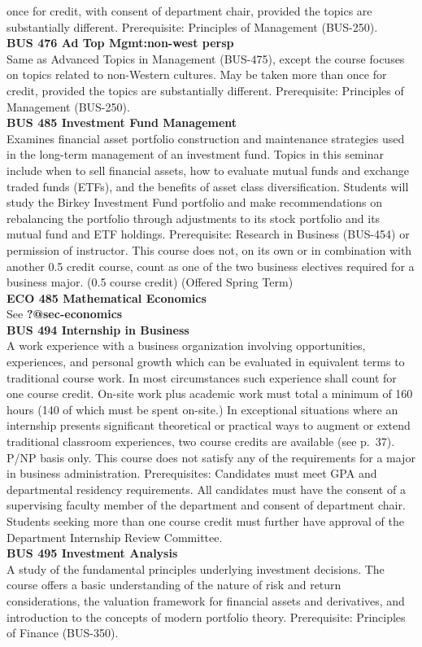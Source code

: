 \documentclass[
  letterpaper,
]{scrbook}
\begin{document}
once for credit, with consent of department chair, provided the topics
are substantially different. Prerequisite: Principles of Management
(BUS-250).\\
\textbf{BUS 476 Ad Top Mgmt:non-west persp}\\
Same as Advanced Topics in Management (BUS-475), except the course
focuses on topics related to non-Western cultures. May be taken more
than once for credit, provided the topics are substantially different.
Prerequisite: Principles of Management (BUS-250).\\
\textbf{BUS 485 Investment Fund Management}\\
Examines financial asset portfolio construction and maintenance
strategies used in the long-term management of an investment fund.
Topics in this seminar include when to sell financial assets, how to
evaluate mutual funds and exchange traded funds (ETFs), and the benefits
of asset class diversification. Students will study the Birkey
Investment Fund portfolio and make recommendations on rebalancing the
portfolio through adjustments to its stock portfolio and its mutual fund
and ETF holdings. Prerequisite: Research in Business (BUS-454) or
permission of instructor. This course does not, on its own or in
combination with another 0.5 credit course, count as one of the two
business electives required for a business major. (0.5 course credit)
(Offered Spring Term)\\
\textbf{ECO 485 Mathematical Economics}\\
See \textbf{?@sec-economics}\\
\textbf{BUS 494 Internship in Business}\\
A work experience with a business organization involving opportunities,
experiences, and personal growth which can be evaluated in equivalent
terms to traditional course work. In most circumstances such experience
shall count for one course credit. On-site work plus academic work must
total a minimum of 160 hours (140 of which must be spent on-site.) In
exceptional situations where an internship presents significant
theoretical or practical ways to augment or extend traditional classroom
experiences, two course credits are available (see p.~37). P/NP basis
only. This course does not satisfy any of the requirements for a major
in business administration. Prerequisites: Candidates must meet GPA and
departmental residency requirements. All candidates must have the
consent of a supervising faculty member of the department and consent of
department chair. Students seeking more than one course credit must
further have approval of the Department Internship Review Committee.\\
\textbf{BUS 495 Investment Analysis}\\
A study of the fundamental principles underlying investment decisions.
The course offers a basic understanding of the nature of risk and return
considerations, the valuation framework for financial assets and
derivatives, and introduction to the concepts of modern portfolio
theory. Prerequisite: Principles of Finance (BUS-350).
\end{document}
